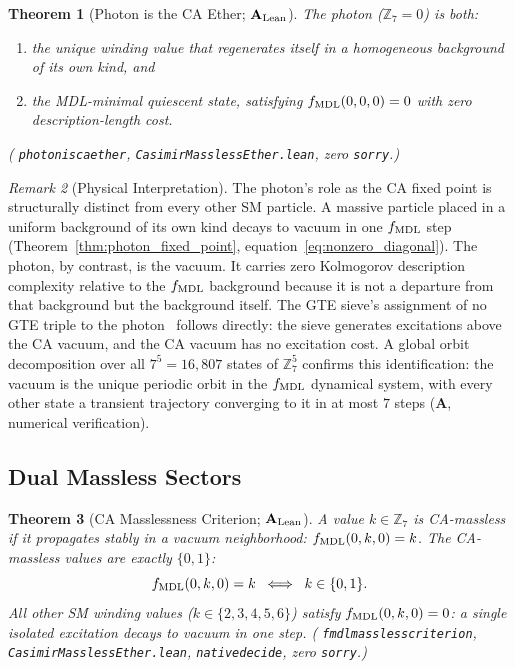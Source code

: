 \documentclass[11pt]{article}
\newtheorem{theorem}{Theorem}[section]
\theoremstyle{remark}
\newtheorem{remark}[theorem]{Remark}
\newcommand{\lean}[1]{%
  \penalty-100
  \begingroup\def\_{\textunderscore\allowbreak}\texttt{#1}\endgroup}
\newcommand{\CatA}{\textbf{A}}
\newcommand{\CatAL}{\ensuremath{\textbf{A}_{\rm Lean}}}
\begin{document}
\begin{theorem}[Photon is the CA Ether; $\CatAL$]
\label{thm:photon_ca_ether}
The photon ($\mathbb{Z}_7 = 0$) is both:
\begin{enumerate}[nosep,leftmargin=1.5em]
\item the unique winding value that regenerates itself in a homogeneous
  background of its own kind, and
\item the MDL-minimal quiescent state, satisfying
  $f_{\rm MDL}(0,0,0) = 0$ with zero description-length cost.
\end{enumerate}
(\lean{photon\_is\_ca\_ether}, \texttt{CasimirMasslessEther.lean},
zero \texttt{sorry}.)
\end{theorem}

\begin{remark}[Physical Interpretation]
The photon's role as the CA fixed point is structurally distinct from every
other SM particle.  A massive particle placed in a uniform background of its
own kind decays to vacuum in one $f_{\rm MDL}$ step
(Theorem~\ref{thm:photon_fixed_point}, equation~\eqref{eq:nonzero_diagonal}).
The photon, by contrast, is the vacuum.  It carries zero Kolmogorov
description complexity relative to the $f_{\rm MDL}$ background because it is
not a departure from that background but the background itself.
The GTE sieve's assignment of no GTE triple to the photon~\cite{SpivackCompUniversality}
follows directly: the sieve generates excitations above the CA vacuum, and
the CA vacuum has no excitation cost.
A global orbit decomposition over all $7^5 = 16{,}807$ states of $\mathbb{Z}_7^5$
confirms this identification: the vacuum is the unique periodic orbit in the
$f_{\rm MDL}$ dynamical system, with every other state a transient trajectory
converging to it in at most $7$ steps ($\CatA$, numerical verification).
\end{remark}

\subsection{Dual Massless Sectors}
\label{sec:dual_massless}

\begin{theorem}[CA Masslessness Criterion; $\CatAL$]
\label{thm:massless_criterion}
A value $k \in \mathbb{Z}_7$ is \emph{CA-massless} if it propagates stably in
a vacuum neighborhood: $f_{\rm MDL}(0, k, 0) = k$.
The CA-massless values are exactly $\{0, 1\}$:
\begin{equation}
  f_{\rm MDL}(0, k, 0) = k \;\iff\; k \in \{0, 1\}.
  \label{eq:massless_criterion}
\end{equation}
All other SM winding values ($k \in \{2,3,4,5,6\}$) satisfy
$f_{\rm MDL}(0,k,0) = 0$: a single isolated excitation decays to vacuum
in one step.
(\lean{fmdl\_massless\_criterion}, \texttt{CasimirMasslessEther.lean},
\lean{native\_decide}, zero \texttt{sorry}.)
\end{theorem}
\end{document}
